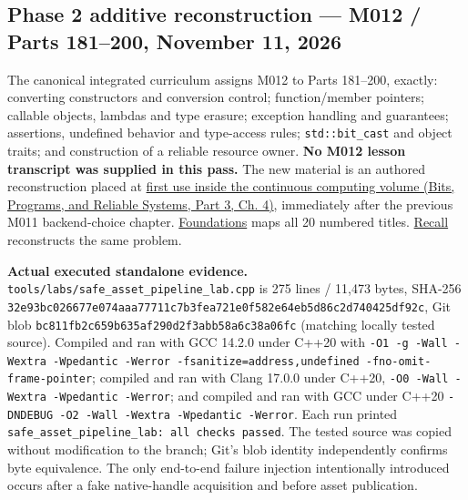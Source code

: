 \subsection{Phase 2 additive reconstruction --- M012 / Parts 181--200, November 11, 2026}\label{appendix-a103e7846d21-phase-2-additive-reconstruction-m012-parts-181200-november-11-2026}

\hypertarget{appendix-a103e7846d21-phase-2-additive-reconstruction-m012-parts-181200-november-11-2026}{}

The canonical integrated curriculum assigns M012 to Parts 181--200, exactly: converting constructors and conversion control; function/member pointers; callable objects, lambdas and type erasure; exception handling and guarantees; assertions, undefined behavior and type-access rules; \texttt{std::bit\_cast} and object traits; and construction of a reliable resource owner. \textbf{No M012 lesson transcript was supplied in this pass.} The new material is an authored reconstruction placed at \href{../01-Bits-Programs-and-Reliable-Systems-P03/main.pdf\#nameddest=01-foundations-i-ch004-from-an-accepted-render-request-to-a-resource-that-survives-failures-and-callbacks}{first use inside the continuous computing volume (Bits, Programs, and Reliable Systems, Part 3, Ch. 4)}, immediately after the previous M011 backend-choice chapter. \hyperref[appendix-fd090d982a15-m012-parts-181200-typed-asset-requests-deferred-callbacks-and-transactional-publication]{Foundations} maps all 20 numbered titles. \hyperref[appendix-960160274237-one-request-one-transaction-callbacks-that-may-outlive-their-caller-m012-reconstruction]{Recall} reconstructs the same problem.

\textbf{Actual executed standalone evidence.} \texttt{tools/labs/safe\_asset\_pipeline\_lab.cpp} is 275 lines / 11,473 bytes, SHA-256 \texttt{32e93bc026677e074aaa77711c7b3fea721e0f582e64eb5d86c2d740425df92c}, Git blob \texttt{bc811fb2c659b635af290d2f3abb58a6c38a06fc} (matching locally tested source). Compiled and ran with GCC 14.2.0 under C++20 with \texttt{-O1\ -g\ -Wall\ -Wextra\ -Wpedantic\ -Werror\ -fsanitize=address,undefined\ -fno-omit-frame-pointer}; compiled and ran with Clang 17.0.0 under C++20, \texttt{-O0\ -Wall\ -Wextra\ -Wpedantic\ -Werror}; and compiled and ran with GCC under C++20 \texttt{-DNDEBUG\ -O2\ -Wall\ -Wextra\ -Wpedantic\ -Werror}. Each run printed \texttt{safe\_asset\_pipeline\_lab:\ all\ checks\ passed}. The tested source was copied without modification to the branch; Git's blob identity independently confirms byte equivalence. The only end-to-end failure injection intentionally introduced occurs after a fake native-handle acquisition and before asset publication.

